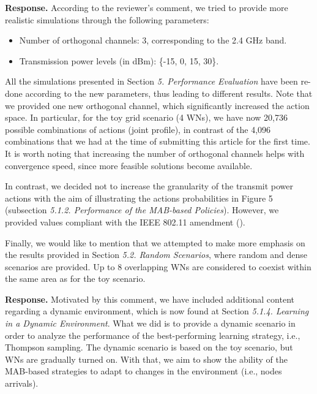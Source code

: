 \documentclass[a4paper,twoside,11pt]{reviewresponse}
\begin{document}
\textbf{Response.} According to the reviewer's comment, we tried to provide more realistic simulations through the following parameters:
\begin{itemize}
    \item Number of orthogonal channels: 3, corresponding to the 2.4 GHz band.
    \item Transmission power levels (in dBm): \{-15, 0, 15, 30\}.
\end{itemize}

All the simulations presented in Section \textit{5. Performance Evaluation} have been re-done according to the new parameters, thus leading to different results. Note that we provided one new orthogonal channel, which significantly increased the action space. In particular, for the toy grid scenario (4 WNs), we have now 20,736 possible combinations of actions (joint profile), in contrast of the 4,096 combinations that we had at the time of submitting this article for the first time. It is worth noting that increasing the number of orthogonal channels helps with convergence speed, since more feasible solutions become available. 

In contrast, we decided not to increase the granularity of the transmit power actions with the aim of illustrating the actions probabilities in Figure 5 (subsection \textit{5.1.2. Performance of the MAB-based Policies}). However, we provided values compliant with the IEEE 802.11 amendment (\cite{kasslin2000tpc}).

Finally, we would like to mention that we attempted to make more emphasis on the results provided in Section \textit{5.2. Random Scenarios}, where random and dense scenarios are provided. Up to 8 overlapping WNs are considered to coexist within the same area as for the toy scenario.


\textbf{Response.} Motivated by this comment, we have included additional content regarding a dynamic environment, which is now found at Section \textit{5.1.4. Learning in a Dynamic Environment}. What we did is to provide a dynamic scenario in order to analyze the performance of the best-performing learning strategy, i.e., Thompson sampling. The dynamic scenario is based on the toy scenario, but WNs are gradually turned on. With that, we aim to show the ability of the MAB-based strategies to adapt to changes in the environment (i.e., nodes arrivals).
\end{document}
